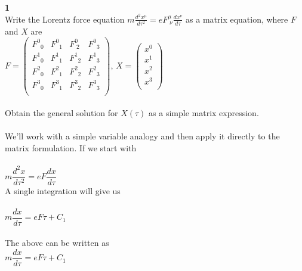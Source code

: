 \documentclass[prb,preprint]
{revtex4-1}
\begin{document}
\textbf{1}
\\
Write the Lorentz force equation $m \frac{d^2 x^\mu}{d\tau^2} = e F^\mu_{\;\nu} \frac{d x^\nu}{d\tau}$ as a matrix equation, where $F$ and $X$ are 
\\
$F = \begin{pmatrix}
F^0_{\;\;0} & F^0_{\;\;1} & F^0_{\;2} & F^0_{\;\;3}\\
F^1_{\;\;0} & F^1_{\;\;1} & F^1_{\;\;2} & F^1_{\;\;3}\\
F^2_{\;\;0} & F^2_{\;\;1} & F^2_{\;\;2} & F^2_{\;\;3}\\
F^3_{\;\;0} & F^3_{\;\;1} & F^3_{\;\;2} & F^3_{\;\;3}\\
\end{pmatrix} $, 
$X = \begin{pmatrix}
x^0\\
x^1\\
x^2\\
x^3\\
\end{pmatrix} $
\\
\\
Obtain the general solution for $X\left(\tau\right)$ as a simple matrix expression.
\\
\\
We'll work with a simple variable analogy and then apply it directly to the matrix formulation.  If we start with 
\\
\\
$m\dfrac{d^2 x}{d\tau^2} = e F \dfrac{d x}{d\tau}$
\\
A single integration will give us
\\
\\
$m\dfrac{d x}{d\tau} = e F \tau + C_1$
\\
\\
The above can be written as 
\\
$m\dfrac{d x}{d\tau} = e F \tau + C_1$
\\
\end{document}
